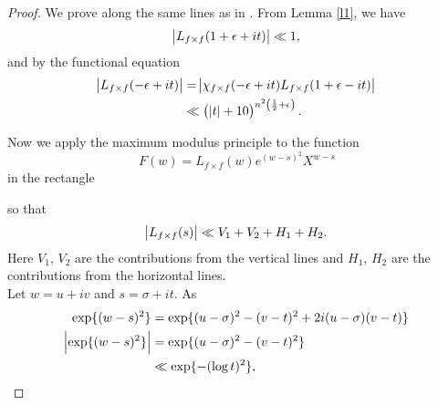 \documentclass[sn-mathphys,Numbered]{sn-jnl}
\theoremstyle{thmstyleone}%
\theoremstyle{thmstyletwo}%
\theoremstyle{thmstylethree}%
\begin{document}
\begin{proof}
We prove along the same lines as in \cite[Lemma 3.5]{As}. From Lemma \ref{l1}, we have
$$ \abs{L_{f \times f}(1+\epsilon+it)} \ll 1 , $$
and by the functional equation
\begin{align*}
\abs{L_{f \times f}(-\epsilon+it)} &= \abs{\chi_{f \times f}(-\epsilon+it) L_{f \times f}(1+\epsilon-it)} \\
&\ll \left(\, \abs{t}+10 \right)^{n^2 \left( \frac{1}{2} + \epsilon \right)}. \\
\end{align*}

\noindent
Now we apply the maximum modulus principle to the function 
$$ F(w) = L_{f \times f}(w) e^{(w-s)^2} X^{w-s} $$
in the rectangle 

\begin{figure}[h!]
\begin{center}
\end{center}
\end{figure}


so that
$$ \abs{L_{f \times f}(s)} \ll V_1+V_2+H_1+H_2 .$$
Here $V_1,\,V_2$ are the contributions from the vertical lines and $H_1,\,H_2$ are the contributions from the horizontal lines. \\


Let $w=u+iv$ and $s=\sigma+it$. As
\begin{align*}
\exp \{ (w-s)^2 \} &= \exp \{ (u-\sigma)^2 - (v-t)^2 +2i(u-\sigma)(v-t) \} \\
\abs{ \exp \{ (w-s)^2 \} } &= \exp \{ (u-\sigma)^2 - (v-t)^2 \} \\
&\ll \exp \{ -(\log t)^2 \},
\end{align*}



\end{proof}
\end{document}

